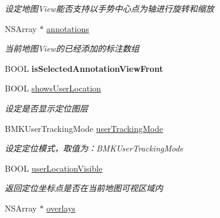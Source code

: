 \begin{DoxyCompactItemize}
\begin{DoxyCompactList}\small\item\em 设定地图\+View能否支持以手势中心点为轴进行旋转和缩放 \end{DoxyCompactList}\item 
\hypertarget{interface_b_m_k_map_view_a61bc5de820abcf06bf3792c933f3e618}{}N\+S\+Array $\ast$ \hyperlink{interface_b_m_k_map_view_a61bc5de820abcf06bf3792c933f3e618}{annotations}\label{interface_b_m_k_map_view_a61bc5de820abcf06bf3792c933f3e618}

\begin{DoxyCompactList}\small\item\em 当前地图\+View的已经添加的标注数组 \end{DoxyCompactList}\item 
\hypertarget{interface_b_m_k_map_view_a5907ada55d984353e2af6c510a334810}{}B\+O\+O\+L {\bfseries is\+Selected\+Annotation\+View\+Front}\label{interface_b_m_k_map_view_a5907ada55d984353e2af6c510a334810}

\item 
\hypertarget{interface_b_m_k_map_view_a6e18e9532c42e940eca7739378348af4}{}B\+O\+O\+L \hyperlink{interface_b_m_k_map_view_a6e18e9532c42e940eca7739378348af4}{shows\+User\+Location}\label{interface_b_m_k_map_view_a6e18e9532c42e940eca7739378348af4}

\begin{DoxyCompactList}\small\item\em 设定是否显示定位图层 \end{DoxyCompactList}\item 
\hypertarget{interface_b_m_k_map_view_aac0adfff30441312452cef6844ef818b}{}B\+M\+K\+User\+Tracking\+Mode \hyperlink{interface_b_m_k_map_view_aac0adfff30441312452cef6844ef818b}{user\+Tracking\+Mode}\label{interface_b_m_k_map_view_aac0adfff30441312452cef6844ef818b}

\begin{DoxyCompactList}\small\item\em 设定定位模式，取值为：\+B\+M\+K\+User\+Tracking\+Mode \end{DoxyCompactList}\item 
\hypertarget{interface_b_m_k_map_view_ada9feb9e53eb9611b57a596c572bb280}{}B\+O\+O\+L \hyperlink{interface_b_m_k_map_view_ada9feb9e53eb9611b57a596c572bb280}{user\+Location\+Visible}\label{interface_b_m_k_map_view_ada9feb9e53eb9611b57a596c572bb280}

\begin{DoxyCompactList}\small\item\em 返回定位坐标点是否在当前地图可视区域内 \end{DoxyCompactList}\item 
\hypertarget{interface_b_m_k_map_view_a6c673c46ad9f146f80e48d82ebcf934b}{}N\+S\+Array $\ast$ \hyperlink{interface_b_m_k_map_view_a6c673c46ad9f146f80e48d82ebcf934b}{overlays}\label{interface_b_m_k_map_view_a6c673c46ad9f146f80e48d82ebcf934b}


\end{DoxyCompactItemize}

